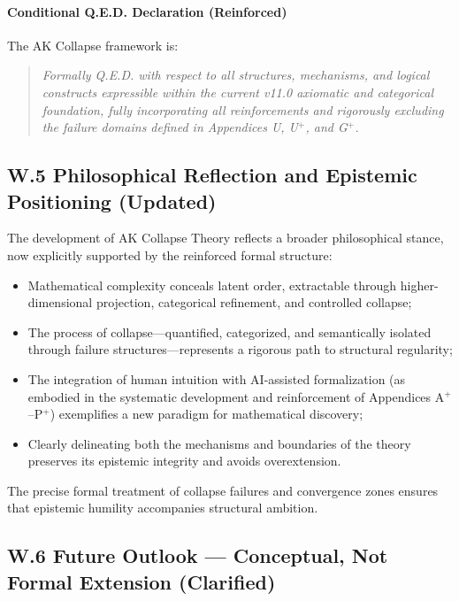 \documentclass[11pt]{article}
\begin{document}
\paragraph{Conditional Q.E.D. Declaration (Reinforced)}  
The AK Collapse framework is:

\begin{quote}
\textit{Formally Q.E.D. with respect to all structures, mechanisms, and logical constructs expressible within the current v11.0 axiomatic and categorical foundation, fully incorporating all reinforcements and rigorously excluding the failure domains defined in Appendices U, U$^{+}$, and G$^{+}$.}
\end{quote}

\subsection*{W.5 Philosophical Reflection and Epistemic Positioning (Updated)}

The development of AK Collapse Theory reflects a broader philosophical stance, now explicitly supported by the reinforced formal structure:

\begin{itemize}
    \item Mathematical complexity conceals latent order, extractable through higher-dimensional projection, categorical refinement, and controlled collapse;
    \item The process of collapse—quantified, categorized, and semantically isolated through failure structures—represents a rigorous path to structural regularity;
    \item The integration of human intuition with AI-assisted formalization (as embodied in the systematic development and reinforcement of Appendices A$^{+}$–P$^{+}$) exemplifies a new paradigm for mathematical discovery;
    \item Clearly delineating both the mechanisms and boundaries of the theory preserves its epistemic integrity and avoids overextension.
\end{itemize}

The precise formal treatment of collapse failures and convergence zones ensures that epistemic humility accompanies structural ambition.

\subsection*{W.6 Future Outlook — Conceptual, Not Formal Extension (Clarified)}
\end{document}
